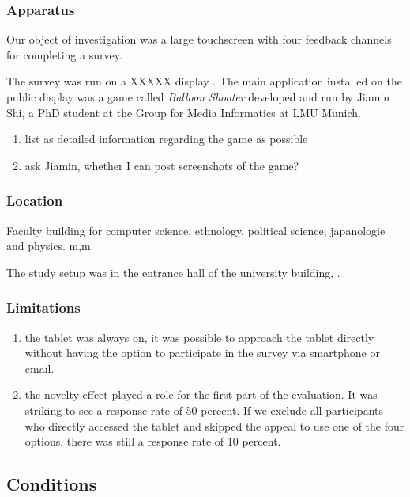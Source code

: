 	\subsubsection{Apparatus}

		Our object of investigation was a large touchscreen with four feedback channels for completing a survey.

		The survey was run on a XXXXX display . The main application installed on the public display was a game called \textit{Balloon Shooter} developed and run by Jiamin Shi, a PhD student at the Group for Media Informatics at LMU Munich.

		\begin{enumerate}
		\item list as detailed information regarding the game as possible
		\item ask Jiamin, whether I can post screenshots of the game?
		\end{enumerate}

	\subsubsection{Location}

	Faculty building for computer science, ethnology, political science, japanologie and physics. m,m

	The study setup was in the entrance hall of the university building, .



	\subsubsection{Limitations}

	\begin{enumerate}
	\item the tablet was always on, it was possible to approach the tablet directly without having the option to participate in the survey via smartphone or email. 
	\item the novelty effect played a role for the first part of the evaluation. It was striking to see a response rate of 50 percent. If we exclude all participants who directly accessed the tablet and skipped the appeal to use one of the four options, there was still a response rate of 10 percent.
	\end{enumerate}



\subsection{Conditions}

